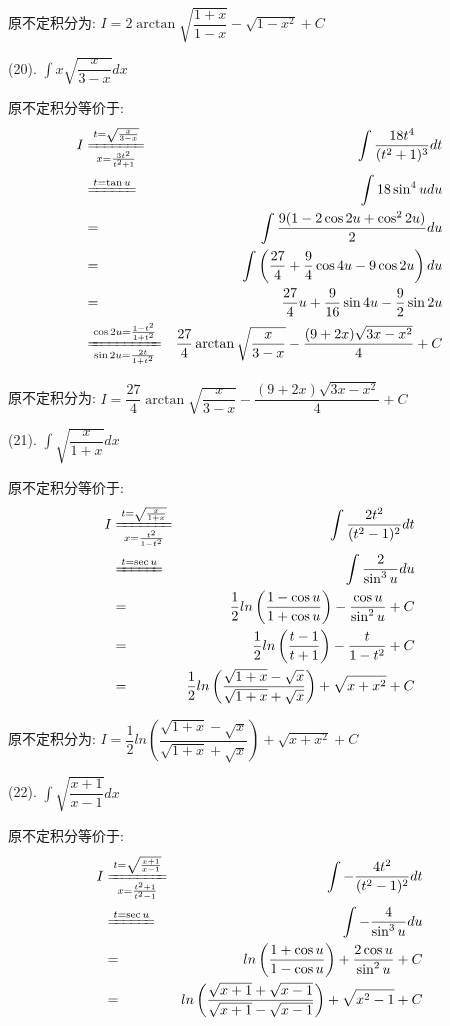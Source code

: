 \begin{anymark}[积分训练]
\begin{solution}
		原不定积分为:  $I=2\arctan\sqrt{\dfrac{1+x}{1-x}}-\sqrt{1-x^2}+C$
	\end{solution}
	(20). $\int x\sqrt{\dfrac{x}{3-x}}dx$
	\begin{solution}
		
		原不定积分等价于:  
		\begin{eqnarray*}
			I&\xlongequal[x=\frac{3t^2}{t^2+1}]{t=\sqrt{\frac{x}{3-x}}}&\int\dfrac{18t^4}{(t^2+1)^3}dt\\
			&\xlongequal{t=\tan u}&\int 18\sin^4 udu\\
			&=&\int \dfrac{9(1-2\cos 2u+\cos^22u)}{2}du\\
			&=&\int \left( \dfrac{27}{4}+\dfrac{9}{4}\cos 4u-9\cos 2u\right)du\\
			&=&\dfrac{27}{4}u+\dfrac{9}{16}\sin 4u-\dfrac{9}{2}\sin 2u\\
			&\xlongequal[\sin 2u=\frac{2t}{1+t^2}]{\cos 2u=\frac{1-t^2}{1+t^2}}& \dfrac{27}{4}\arctan\sqrt{\dfrac{x}{3-x}}-\dfrac{(9+2x)\sqrt{3x-x^2}}{4}+C
		\end{eqnarray*}
		
		原不定积分为:  $I=\dfrac{27}{4}\arctan\sqrt{\dfrac{x}{3-x}}-\dfrac{(9+2x)\sqrt{3x-x^2}}{4}+C$
	\end{solution}
	(21). $\int \sqrt{\dfrac{x}{1+x}}dx$
	\begin{solution}
		
		原不定积分等价于:  
		\begin{eqnarray*}
			I&\xlongequal[x=\frac{t^2}{1-t^2}]{t=\sqrt{\frac{x}{1+x}}}&\int\dfrac{2t^2}{(t^2-1)^2}dt\\
			&\xlongequal{t=\sec u}&\int \dfrac{2}{\sin^3 u}du\\
			&=&\dfrac{1}{2}ln\left(\dfrac{1-\cos u}{1+\cos u} \right)-\dfrac{\cos u}{\sin^2 u}+C\\
			&=&\dfrac{1}{2}ln\left(\dfrac{t-1}{t+1} \right)-\dfrac{t}{1-t^2}+C\\
			&=&\dfrac{1}{2}ln\left(\dfrac{\sqrt{1+x}-\sqrt{x}}{\sqrt{1+x}+\sqrt{x}} \right)+\sqrt{x+x^2}+C
		\end{eqnarray*}
		
		原不定积分为:  $I=\dfrac{1}{2}ln\left(\dfrac{\sqrt{1+x}-\sqrt{x}}{\sqrt{1+x}+\sqrt{x}} \right)+\sqrt{x+x^2}+C$
	\end{solution}
	(22). $\int \sqrt{\dfrac{x+1}{x-1}}dx$
	\begin{solution}
		
		原不定积分等价于:  
		\begin{eqnarray*}
			I&\xlongequal[x=\frac{t^2+1}{t^2-1}]{t=\sqrt{\frac{x+1}{x-1}}}&\int-\dfrac{4t^2}{(t^2-1)^2}dt\\
			&\xlongequal{t=\sec u}&\int -\dfrac{4}{\sin^3 u}du\\
			&=&ln\left(\dfrac{1+\cos u}{1-\cos u} \right)+\dfrac{2\cos u}{\sin^2 u}+C\\
			&=&ln\left(\dfrac{\sqrt{x+1}+\sqrt{x-1}}{\sqrt{x+1}-\sqrt{x-1}} \right)+\sqrt{x^2-1}+C
		\end{eqnarray*}
		

\end{solution}
\end{anymark}
